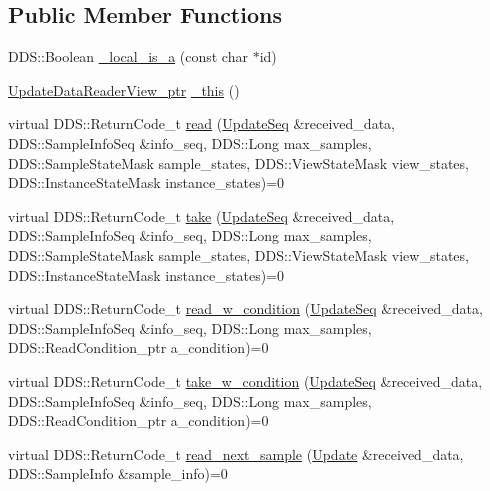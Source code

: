 \subsection*{Public Member Functions}
\begin{DoxyCompactItemize}
\item 
DDS::Boolean \hyperlink{classKnowledge_1_1UpdateDataReaderView_a7a3d481821f1d00dbfb5e269f7746c3b}{\_\-local\_\-is\_\-a} (const char $\ast$id)
\item 
\hyperlink{classKnowledge_1_1UpdateDataReaderView}{UpdateDataReaderView\_\-ptr} \hyperlink{classKnowledge_1_1UpdateDataReaderView_adc4038812e92634b62356e2f08eaada3}{\_\-this} ()
\item 
virtual DDS::ReturnCode\_\-t \hyperlink{classKnowledge_1_1UpdateDataReaderView_a80ac22448a45129f96f88ed14973ef32}{read} (\hyperlink{namespaceKnowledge_ab62e46316b954f0d249e0e45de7059dc}{UpdateSeq} \&received\_\-data, DDS::SampleInfoSeq \&info\_\-seq, DDS::Long max\_\-samples, DDS::SampleStateMask sample\_\-states, DDS::ViewStateMask view\_\-states, DDS::InstanceStateMask instance\_\-states)=0
\item 
virtual DDS::ReturnCode\_\-t \hyperlink{classKnowledge_1_1UpdateDataReaderView_a80c892210ddec9bdd7f61daae5f576ae}{take} (\hyperlink{namespaceKnowledge_ab62e46316b954f0d249e0e45de7059dc}{UpdateSeq} \&received\_\-data, DDS::SampleInfoSeq \&info\_\-seq, DDS::Long max\_\-samples, DDS::SampleStateMask sample\_\-states, DDS::ViewStateMask view\_\-states, DDS::InstanceStateMask instance\_\-states)=0
\item 
virtual DDS::ReturnCode\_\-t \hyperlink{classKnowledge_1_1UpdateDataReaderView_a032d5e331d406106174f5a457f37803d}{read\_\-w\_\-condition} (\hyperlink{namespaceKnowledge_ab62e46316b954f0d249e0e45de7059dc}{UpdateSeq} \&received\_\-data, DDS::SampleInfoSeq \&info\_\-seq, DDS::Long max\_\-samples, DDS::ReadCondition\_\-ptr a\_\-condition)=0
\item 
virtual DDS::ReturnCode\_\-t \hyperlink{classKnowledge_1_1UpdateDataReaderView_a509e331b78354c9fcdd7667d4bd80461}{take\_\-w\_\-condition} (\hyperlink{namespaceKnowledge_ab62e46316b954f0d249e0e45de7059dc}{UpdateSeq} \&received\_\-data, DDS::SampleInfoSeq \&info\_\-seq, DDS::Long max\_\-samples, DDS::ReadCondition\_\-ptr a\_\-condition)=0
\item 
virtual DDS::ReturnCode\_\-t \hyperlink{classKnowledge_1_1UpdateDataReaderView_a7c64f7bea38ec05f4168df0b31457a94}{read\_\-next\_\-sample} (\hyperlink{structKnowledge_1_1Update}{Update} \&received\_\-data, DDS::SampleInfo \&sample\_\-info)=0

\end{DoxyCompactItemize}
